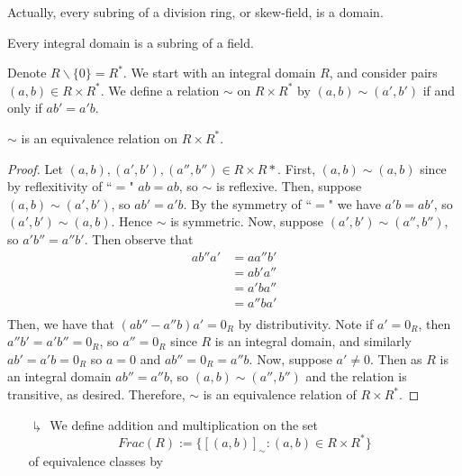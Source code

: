 \documentclass[12pt, a4paper, oneside, openright, titlepage]{book}
\begin{document}
\begin{rmk}
    Actually, every subring of a division ring, or skew-field, is a domain.
\end{rmk}

\begin{thm}
    Every integral domain is a subring of a field.
\end{thm}

\begin{cons}
    Denote $R\backslash\{0\} = R^*$. We start with an integral domain $R$, and consider pairs $(a,b) \in R\times R^*$. We define a relation $\sim$ on $R\times R^*$ by $(a,b) \sim (a',b')$ if and only if $ab' = a'b$.
    \begin{claim}
        $\sim$ is an equivalence relation on $R\times R^*$.
    \end{claim}
    \begin{proof}
        Let $(a,b),(a',b'), (a'',b'') \in R\times R*$. First, $(a,b)\sim (a,b)$ since by reflexitivity of ``$=$" $ab = ab$, so $\sim$ is reflexive. Then, suppose $(a,b)\sim (a',b')$, so $ab' = a'b$. By the symmetry of ``$=$" we have $a'b = ab'$, so $(a',b') \sim (a,b)$. Hence $\sim$ is symmetric. Now, suppose $(a',b') \sim (a'',b'')$, so $a'b'' = a''b'$. Then observe that \begin{align*}
            ab''a' &= aa''b'\\
            &= ab'a'' \tag{commutivity}\\
            &= a'ba'' \\
            &= a''ba' \tag{commutivity} \\
        \end{align*}
        Then, we have that $(ab'' - a''b)a' = 0_R$ by distributivity. Note if $a' = 0_R$, then $a''b' = a'b'' = 0_R$, so $a'' = 0_R$ since $R$ is an integral domain, and similarly $ab' = a'b = 0_R$ so $a=0$ and $ab'' = 0_R = a''b$. Now, suppose $a' \neq 0$. Then as $R$ is an integral domain $ab'' = a''b$, so $(a,b) \sim (a'',b'')$ and the relation is transitive, as desired. Therefore, $\sim$ is an equivalence relation of $R\times R^*$.
    \end{proof}
    \begin{enumerate}
        \item[$\drsh$] We define addition and multiplication on the set \begin{equation}
            Frac(R) := \{[(a,b)]_{\sim}:(a,b) \in R\times R^*\}
        \end{equation}
        of equivalence classes by \begin{equation}

\end{equation}
\end{enumerate}
\end{cons}
\end{document}
